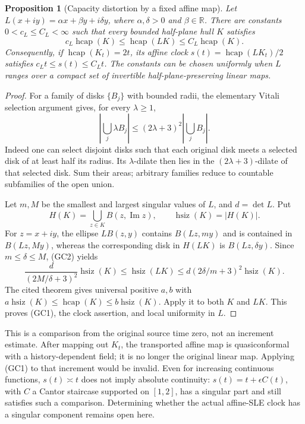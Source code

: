 \documentclass[11pt]{article}
\newtheorem{proposition}[theorem]{Proposition}
\theoremstyle{definition}\newtheorem{definition}[theorem]{Definition}
\theoremstyle{remark}\newtheorem{remark}[theorem]{Remark}
\begin{document}
\begin{proposition}[Capacity distortion by a fixed affine map]
\label{prop:global-affine-capacity}
Let $L(x+iy)=\alpha x+\beta y+i\delta y$, where
$\alpha,\delta>0$ and $\beta\in\mathbb R$. There are constants
$0<c_L\le C_L<\infty$ such that every bounded half-plane hull $K$
satisfies
\[
 c_L\operatorname{hcap}(K)\le\operatorname{hcap}(LK)
          \le C_L\operatorname{hcap}(K).
 \tag{GC1}
\]
Consequently, if $\operatorname{hcap}(K_t)=2t$, its affine clock
$s(t)=\operatorname{hcap}(LK_t)/2$ satisfies $c_Lt\le s(t)\le C_Lt$.
The constants can be chosen uniformly when $L$ ranges over a compact
set of invertible half-plane-preserving linear maps.
\end{proposition}
\begin{proof}
For a family of disks $\{B_j\}$ with bounded radii, the elementary
Vitali selection argument gives, for every $\lambda\ge1$,
\[
 \left|\bigcup_j\lambda B_j\right|
       \le(2\lambda+3)^2\left|\bigcup_jB_j\right|.
 \tag{GC2}
\]
Indeed one can select disjoint disks such that each original disk
meets a selected disk of at least half its radius. Its $\lambda$-dilate
then lies in the $(2\lambda+3)$-dilate of that selected disk. Sum their
areas; arbitrary families reduce to countable subfamilies of the open
union.

Let $m,M$ be the smallest and largest singular values of $L$, and
$d=\det L$. Put
\[
 H(K)=\bigcup_{z\in K}B(z,\operatorname{Im}z),
 \qquad \operatorname{hsiz}(K)=|H(K)|.
\]
For $z=x+iy$, the ellipse $LB(z,y)$ contains $B(Lz,my)$ and is
contained in $B(Lz,My)$, whereas the corresponding disk in $H(LK)$
is $B(Lz,\delta y)$. Since $m\le\delta\le M$, (GC2) yields
\[
 \frac{d}{(2M/\delta+3)^2}\operatorname{hsiz}(K)
 \le\operatorname{hsiz}(LK)
 \le d(2\delta/m+3)^2\operatorname{hsiz}(K).
 \tag{GC3}
\]
The cited theorem gives universal positive $a,b$ with
$a\operatorname{hsiz}(K)\le\operatorname{hcap}(K)
\le b\operatorname{hsiz}(K)$. Apply it to both $K$ and $LK$.
This proves (GC1), the clock assertion, and local uniformity in $L$.
\end{proof}

This is a comparison from the original source time zero, not an
increment estimate. After mapping out $K_t$, the transported affine
map is quasiconformal with a history-dependent field; it is no longer
the original linear map. Applying (GC1) to that increment would be
invalid. Even for increasing continuous functions, $s(t)\asymp t$
does not imply absolute continuity: $s(t)=t+\epsilon C(t)$, with
$C$ a Cantor staircase supported on $[1,2]$, has a singular part and
still satisfies such a comparison. Determining whether the actual
affine-SLE clock has a singular component remains open here.
\end{document}
